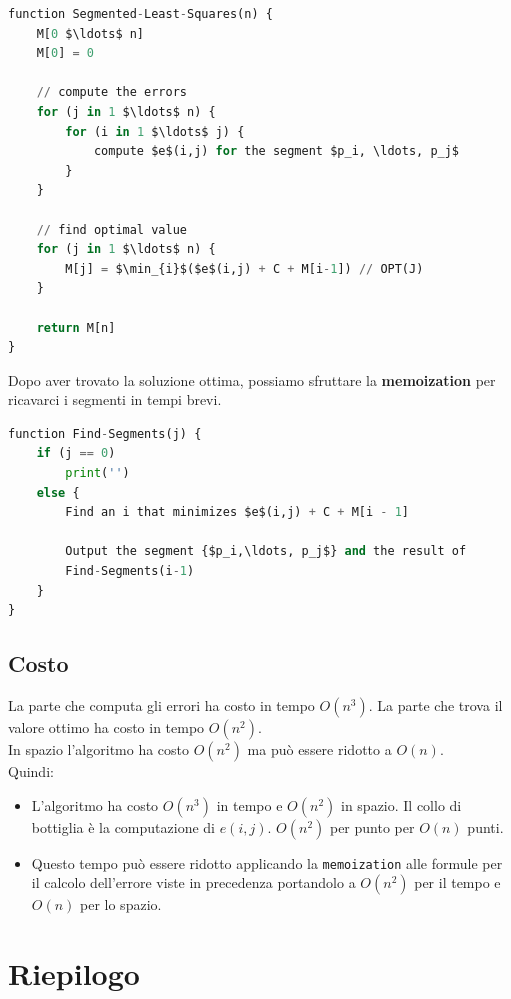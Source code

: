 \begin{lstlisting}[language=Python, mathescape=true]
function Segmented-Least-Squares(n) {
    M[0 $\ldots$ n]
    M[0] = 0
    
    // compute the errors
    for (j in 1 $\ldots$ n) {
        for (i in 1 $\ldots$ j) {
            compute $e$(i,j) for the segment $p_i, \ldots, p_j$
        }
    }

    // find optimal value
    for (j in 1 $\ldots$ n) {
        M[j] = $\min_{i}$($e$(i,j) + C + M[i-1]) // OPT(J)
    }

    return M[n]
}
\end{lstlisting}

Dopo aver trovato la soluzione ottima, possiamo sfruttare la
\textbf{memoization} per ricavarci i segmenti in tempi brevi.

\begin{lstlisting}[language=Python, mathescape=true]
function Find-Segments(j) {
    if (j == 0) 
        print('')
    else {
        Find an i that minimizes $e$(i,j) + C + M[i - 1]

        Output the segment {$p_i,\ldots, p_j$} and the result of
        Find-Segments(i-1)
    }
}
\end{lstlisting}

\subsection{Costo}

La parte che computa gli errori ha costo in tempo $O(n^3)$. La parte
che trova il valore ottimo ha costo in tempo $O(n^2)$.\\

In spazio l'algoritmo ha costo $O(n^2)$ ma può essere ridotto a
$O(n)$.\\

Quindi:
\begin{itemize}
  \item L'algoritmo ha costo $O(n^3)$ in tempo e $O(n^2)$ in
        spazio. Il collo di bottiglia è la computazione di $e(i, j)$.
        $O(n^2)$ per punto per $O(n)$ punti.
  \item Questo tempo può essere
        ridotto applicando la \texttt{memoization} alle formule per il calcolo
        dell'errore viste in precedenza portandolo a $O(n^2)$ per il tempo e
        $O(n)$ per lo spazio.
\end{itemize}

\section{Riepilogo}

